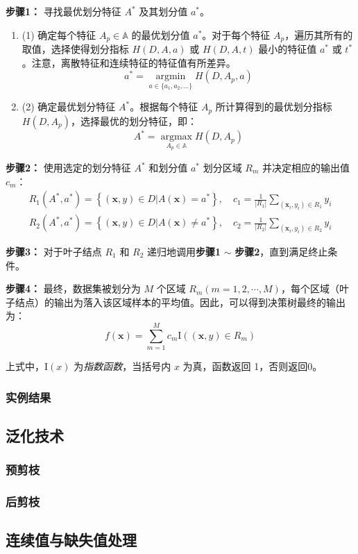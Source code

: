 \documentclass{ctexart}
\numberwithin{equation}{section}
\begin{document}
\textbf{步骤1：} 寻找最优划分特征 $A^*$ 及其划分值 $a^*$。
\begin{enumerate}[\qquad ]
	\item (1) 确定每个特征 $A_p \in \mathbb{A}$ 的最优划分值 $a^*$。对于每个特征 $A_p$，遍历其所有的取值，选择使得划分指标 $H(D,A,a)$ 或 $H(D,A,t)$ 最小的特征值 $a^*$ 或 $t^*$ 。注意，离散特征和连续特征的特征值有所差异。
	\begin{equation}
		a^* = \mathop{\arg\min}\limits_{a \in \{a_1,a_2,...\}} H(D,A_p,a)
	\end{equation}
	
	\item (2) 确定最优划分特征 $A^*$。根据每个特征 $A_p$ 所计算得到的最优划分指标 $H(D, A_p)$，选择最优的划分特征，即：
	\begin{equation}
		A^* = \mathop{\arg\max}\limits_{A_p \in \mathbb{A}} H(D,A_p)
	\end{equation}
\end{enumerate}

\textbf{步骤2：} 使用选定的划分特征 $A^*$ 和划分值 $a^*$ 划分区域 $R_m$ 并决定相应的输出值 $c_m$：
\begin{subequations}
	\begin{align}
		R_1(A^*,a^*) = \left\{(\boldsymbol{x},y) \in D | A(\boldsymbol{x}) = a^* \right\}, \quad 
		c_1 = \frac{1}{|R_1|} \sum_{(\boldsymbol{x}_i,y_i) \in R_1} y_i \\
		R_2(A^*,a^*) = \left\{(\boldsymbol{x},y) \in D | A(\boldsymbol{x}) \neq a^* \right\}, \quad
		c_2 = \frac{1}{|R_2|} \sum_{(\boldsymbol{x}_i,y_i) \in R_2} y_i
	\end{align}
\end{subequations}

\textbf{步骤3：} 对于叶子结点 $R_1$ 和 $R_2$ 递归地调用\textbf{步骤1} $\sim$ \textbf{步骤2}，直到满足终止条件。

\textbf{步骤4：} 最终，数据集被划分为 $M$ 个区域 $R_m(m=1,2,\cdots,M)$，每个区域（叶子结点）的输出为落入该区域样本的平均值。因此，可以得到决策树最终的输出为：
\begin{equation}
	f(\boldsymbol{x}) = \sum_{m=1}^M c_m \text{I} \left( (\boldsymbol{x},y) \in R_m \right)
\end{equation}

上式中，$\text{I}(x)$ 为\emph{指数函数}，当括号内 $x$ 为真，函数返回 1，否则返回0。

\subsubsection{实例结果}


\subsection{泛化技术}

\subsubsection{预剪枝}

\subsubsection{后剪枝}

\subsection{连续值与缺失值处理}


	
\end{document}
